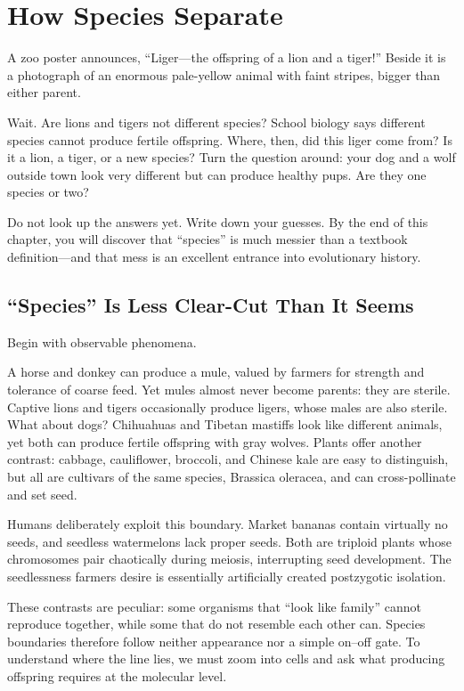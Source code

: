 \chapter{How Species Separate}

\begin{kaichang}
A zoo poster announces, ``Liger---the offspring of a lion and a tiger!'' Beside it is a photograph of an enormous pale-yellow animal with faint stripes, bigger than either parent.

Wait. Are lions and tigers not different species? School biology says different species cannot produce fertile offspring. Where, then, did this liger come from? Is it a lion, a tiger, or a new species? Turn the question around: your dog and a wolf outside town look very different but can produce healthy pups. Are they one species or two?

Do not look up the answers yet. Write down your guesses. By the end of this chapter, you will discover that ``species'' is much messier than a textbook definition---and that mess is an excellent entrance into evolutionary history.
\end{kaichang}

\section{``Species'' Is Less Clear-Cut Than It Seems}

Begin with observable phenomena.

A horse and donkey can produce a mule, valued by farmers for strength and tolerance of coarse feed. Yet mules almost never become parents: they are sterile. Captive lions and tigers occasionally produce ligers, whose males are also sterile. What about dogs? Chihuahuas and Tibetan mastiffs look like different animals, yet both can produce fertile offspring with gray wolves. Plants offer another contrast: cabbage, cauliflower, broccoli, and Chinese kale are easy to distinguish, but all are cultivars of the same species, Brassica oleracea, and can cross-pollinate and set seed.

Humans deliberately exploit this boundary. Market bananas contain virtually no seeds, and seedless watermelons lack proper seeds. Both are triploid plants whose chromosomes pair chaotically during meiosis, interrupting seed development. The seedlessness farmers desire is essentially artificially created postzygotic isolation.

These contrasts are peculiar: some organisms that ``look like family'' cannot reproduce together, while some that do not resemble each other can. Species boundaries therefore follow neither appearance nor a simple on--off gate. To understand where the line lies, we must zoom into cells and ask what producing offspring requires at the molecular level.

